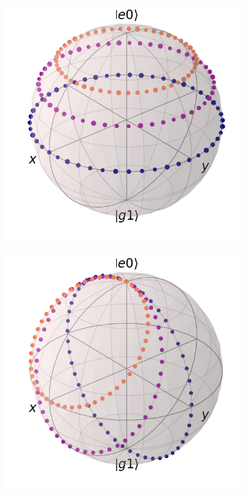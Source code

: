 \begin{figure}[H]
    \centering
    \begin{subfigure}[h]{0.49\textwidth}
        \centering
        \includegraphics[width=\textwidth]{figuras/ch3/bloch berry.png}
        \caption{} 
        \label{fig3:bloch berry}
    \end{subfigure}
    \hfill
    \begin{subfigure}[h]{0.49\textwidth}
        \centering
        \includegraphics[width=\textwidth]{figuras/ch3/bloch cinematica.png}

\end{subfigure}
\end{figure}
